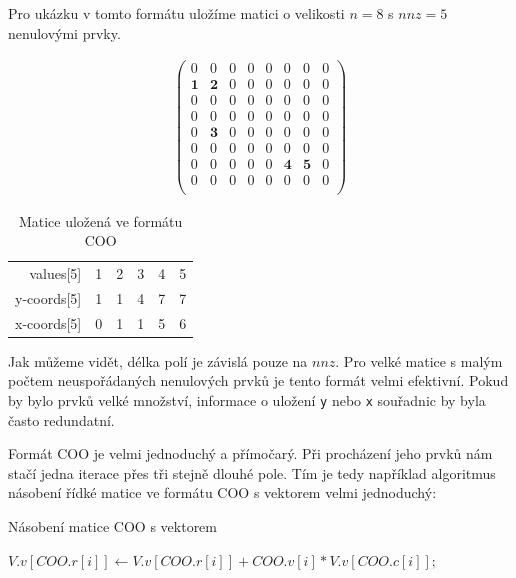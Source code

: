 Pro ukázku v tomto formátu uložíme matici o velikosti $n=8$ s $nnz=5$ nenulovými prvky.

\begin{align}
\begin{pmatrix}
	0 & 0 & 0 & 0 & 0 & 0 & 0 & 0 \\
	\boldsymbol{1} & \boldsymbol{2} & 0 & 0 & 0 & 0 & 0 & 0 \\
	0 & 0 & 0 & 0 & 0 & 0 & 0 & 0 \\
	0 & 0 & 0 & 0 & 0 & 0 & 0 & 0 \\
	0 & \boldsymbol{3} & 0 & 0 & 0 & 0 & 0 & 0 \\
	0 & 0 & 0 & 0 & 0 & 0 & 0 & 0 \\
	0 & 0 & 0 & 0 & 0 & \boldsymbol{4} & \boldsymbol{5} & 0 \\
	0 & 0 & 0 & 0 & 0 & 0 & 0 & 0 \\	
\end{pmatrix}
\end{align}

\begin{table}[H]
    \begin{tabular}{r|lllll}
    values[5]   & 1 & 2 & 3 & 4 & 5 \\
    y-coords[5] & 1 & 1 & 4 & 7 & 7 \\
    x-coords[5] & 0 & 1 & 1 & 5 & 6 \\
    \end{tabular}
    \caption{Matice uložená ve formátu COO}
\end{table}

Jak můžeme vidět, délka polí je závislá pouze na $nnz$. Pro velké matice s malým počtem neuspořádaných nenulových prvků je tento formát velmi efektivní. Pokud by bylo prvků velké množství, informace o uložení \texttt{y} nebo \texttt{x} souřadnic by byla často redundatní.

Formát COO je velmi jednoduchý a přímočarý. Při procházení jeho prvků nám stačí jedna iterace přes tři stejně dlouhé pole. Tím je tedy například algoritmus násobení řídké matice ve formátu COO s vektorem velmi jednoduchý:

\begin{algorithm}[H]
	\caption{Násobení matice COO s vektorem}\label{coo-mvm}
	\begin{algorithmic}[1]
			\State \texttt{$V.v[COO.r[i]] \gets V.v[COO.r[i]] + COO.v[i] * V.v[COO.c[i]];$}
		\EndFor
		\EndProcedure
	\end{algorithmic}
\end{algorithm}

